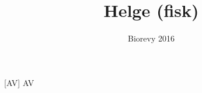 \documentclass[a4paper,11pt]{article}
\title{Helge (fisk)}
\author{Biorevy 2016}
\begin{document}
\maketitle

\begin{roles}
    [AV] AV
\end{roles}

\begin{sketch}


\end{sketch}
\end{document}
